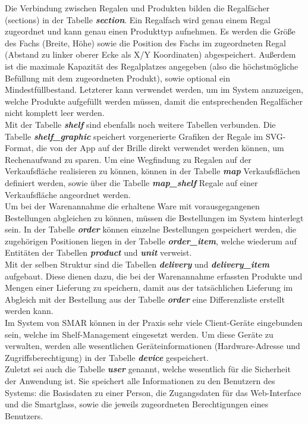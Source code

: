 Die Verbindung zwischen Regalen und Produkten bilden die Regalfächer (\glqq sections\grqq ) in der Tabelle \textit{\textbf{section}}. Ein Regalfach wird genau einem Regal zugeordnet und kann genau einen Produkttyp aufnehmen. Es werden die Größe des Fachs (Breite, Höhe) sowie die Position des Fachs im zugeordneten Regal (Abstand zu linker oberer Ecke als X/Y Koordinaten) abgespeichert. Außerdem ist die maximale Kapazität des Regalplatzes angegeben (also die höchstmögliche Befüllung mit dem zugeordneten Produkt), sowie optional ein Mindestfüllbestand. Letzterer kann verwendet werden, um im System anzuzeigen, welche Produkte aufgefüllt werden müssen, damit die entsprechenden Regalfächer nicht komplett leer werden.\\

Mit der Tabelle  \textit{\textbf{shelf}} sind ebenfalls noch weitere Tabellen verbunden. Die Tabelle  \textit{\textbf{shelf\_graphic}} speichert vorgenerierte Grafiken der Regale im \ac{SVG}-Format, die von der App auf der Brille direkt verwendet werden können, um Rechenaufwand zu sparen. Um eine Wegfindung zu Regalen auf der Verkaufsfläche realisieren zu können, können in der Tabelle \textit{\textbf{map}} Verkaufsflächen definiert werden, sowie über die Tabelle \textit{\textbf{map\_shelf}} Regale auf einer Verkaufsfläche angeordnet werden.\\

Um bei der Warenannahme die erhaltene Ware mit vorausgegangenen Bestellungen abgleichen zu können, müssen die Bestellungen im System hinterlegt sein. In der Tabelle \textit{\textbf{order}} können einzelne Bestellungen gespeichert werden, die zugehörigen Positionen liegen in der Tabelle \textit{\textbf{order\_item}}, welche wiederum auf Entitäten der Tabellen  \textit{\textbf{product}} und \textit{\textbf{unit}} verweist.\\
Mit der selben Struktur sind die Tabellen \textbf{\textit{delivery}} und \textit{\textbf{delivery\_item}} aufgebaut. Diese dienen dazu, die bei der Warenannahme erfassten Produkte und Mengen einer Lieferung zu speichern, damit aus der tatsächlichen Lieferung im Abgleich mit der Bestellung aus der Tabelle \textit{\textbf{order}} eine Differenzliste erstellt werden kann.\\

Im System von \acs{SMAR} können in der Praxis sehr viele Client-Geräte eingebunden sein, welche im Shelf-Management eingesetzt werden. Um diese Geräte zu verwalten, werden alle wesentlichen Geräteinformationen (\zB Hardware-Adresse und Zugriffsberechtigung) in der Tabelle \textit{\textbf{device}} gespeichert.\\

Zuletzt sei auch die Tabelle \textit{\textbf{user}} genannt, welche wesentlich für die Sicherheit der Anwendung ist. Sie speichert alle Informationen zu den Benutzern des Systems: die Basisdaten zu einer Person, die Zugangsdaten für das Web-Interface und die Smartglass, sowie die jeweils zugeordneten Berechtigungen eines Benutzers.\\

